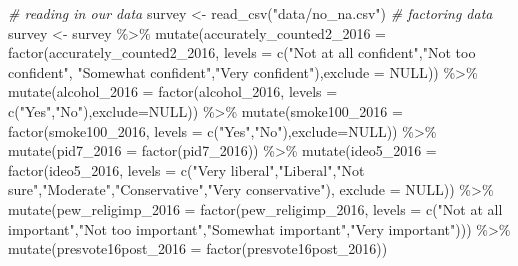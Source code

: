 \documentclass[
]{article}
\newenvironment{Shaded}{\begin{snugshade}}{\end{snugshade}}
\newcommand{\AttributeTok}[1]{\textcolor[rgb]{0.77,0.63,0.00}{#1}}
\newcommand{\CommentTok}[1]{\textcolor[rgb]{0.56,0.35,0.01}{\textit{#1}}}
\newcommand{\ConstantTok}[1]{\textcolor[rgb]{0.00,0.00,0.00}{#1}}
\newcommand{\FunctionTok}[1]{\textcolor[rgb]{0.00,0.00,0.00}{#1}}
\newcommand{\NormalTok}[1]{#1}
\newcommand{\OtherTok}[1]{\textcolor[rgb]{0.56,0.35,0.01}{#1}}
\newcommand{\SpecialCharTok}[1]{\textcolor[rgb]{0.00,0.00,0.00}{#1}}
\newcommand{\StringTok}[1]{\textcolor[rgb]{0.31,0.60,0.02}{#1}}
\begin{document}
\begin{Shaded}
\begin{Highlighting}[]
\CommentTok{\# reading in our data }
\NormalTok{survey }\OtherTok{\textless{}{-}} \FunctionTok{read\_csv}\NormalTok{(}\StringTok{"data/no\_na.csv"}\NormalTok{)}
\CommentTok{\# factoring data}
\NormalTok{survey }\OtherTok{\textless{}{-}}\NormalTok{ survey }\SpecialCharTok{\%\textgreater{}\%}
  \FunctionTok{mutate}\NormalTok{(}\AttributeTok{accurately\_counted2\_2016 =} \FunctionTok{factor}\NormalTok{(accurately\_counted2\_2016, }\AttributeTok{levels =} \FunctionTok{c}\NormalTok{(}\StringTok{"Not at all confident"}\NormalTok{,}\StringTok{"Not too confident"}\NormalTok{,}
                                                                                \StringTok{"Somewhat confident"}\NormalTok{,}\StringTok{"Very confident"}\NormalTok{),}\AttributeTok{exclude =} \ConstantTok{NULL}\NormalTok{)) }\SpecialCharTok{\%\textgreater{}\%}
  \FunctionTok{mutate}\NormalTok{(}\AttributeTok{alcohol\_2016 =} \FunctionTok{factor}\NormalTok{(alcohol\_2016, }\AttributeTok{levels =} \FunctionTok{c}\NormalTok{(}\StringTok{"Yes"}\NormalTok{,}\StringTok{"No"}\NormalTok{),}\AttributeTok{exclude=}\ConstantTok{NULL}\NormalTok{)) }\SpecialCharTok{\%\textgreater{}\%}
  \FunctionTok{mutate}\NormalTok{(}\AttributeTok{smoke100\_2016 =} \FunctionTok{factor}\NormalTok{(smoke100\_2016, }\AttributeTok{levels =} \FunctionTok{c}\NormalTok{(}\StringTok{"Yes"}\NormalTok{,}\StringTok{"No"}\NormalTok{),}\AttributeTok{exclude=}\ConstantTok{NULL}\NormalTok{)) }\SpecialCharTok{\%\textgreater{}\%}
  \FunctionTok{mutate}\NormalTok{(}\AttributeTok{pid7\_2016 =} \FunctionTok{factor}\NormalTok{(pid7\_2016)) }\SpecialCharTok{\%\textgreater{}\%}
  \FunctionTok{mutate}\NormalTok{(}\AttributeTok{ideo5\_2016 =} \FunctionTok{factor}\NormalTok{(ideo5\_2016, }\AttributeTok{levels =} \FunctionTok{c}\NormalTok{(}\StringTok{"Very liberal"}\NormalTok{,}\StringTok{"Liberal"}\NormalTok{,}\StringTok{"Not sure"}\NormalTok{,}\StringTok{"Moderate"}\NormalTok{,}\StringTok{"Conservative"}\NormalTok{,}\StringTok{"Very conservative"}\NormalTok{), }\AttributeTok{exclude =} \ConstantTok{NULL}\NormalTok{)) }\SpecialCharTok{\%\textgreater{}\%}
  \FunctionTok{mutate}\NormalTok{(}\AttributeTok{pew\_religimp\_2016 =} \FunctionTok{factor}\NormalTok{(pew\_religimp\_2016, }\AttributeTok{levels =} \FunctionTok{c}\NormalTok{(}\StringTok{"Not at all important"}\NormalTok{,}\StringTok{"Not too important"}\NormalTok{,}\StringTok{"Somewhat important"}\NormalTok{,}\StringTok{"Very important"}\NormalTok{))) }\SpecialCharTok{\%\textgreater{}\%}
  \FunctionTok{mutate}\NormalTok{(}\AttributeTok{presvote16post\_2016 =} \FunctionTok{factor}\NormalTok{(presvote16post\_2016))}
\end{Highlighting}
\end{Shaded}
\end{document}
